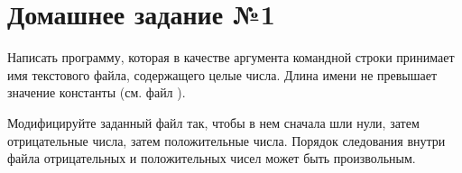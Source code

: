\section*{Домашнее задание №1}

Написать программу, которая в качестве аргумента командной строки
принимает имя текстового файла, содержащего целые числа. Длина
имени не превышает значение константы  (см. файл
).

Модифицируйте заданный файл так, чтобы в нем сначала
шли нули, затем отрицательные числа, затем положительные числа.
Порядок следования внутри файла отрицательных и положительных
чисел может быть произвольным.
